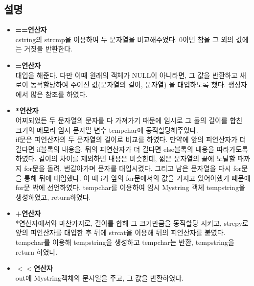 \documentclass[a4paper]{article}
\begin{document}
\subsection{설명}
\begin{itemize}
\item\textbf{==연산자}\\cstring의 strcmp을 이용하여 두 문자열을 비교해주었다. 0이면 참을 그 외의 값에는 거짓을 반환한다.
\item\textbf{=연산자}\\ 대입을 해준다. 다만 이때 원래의 객체가 NULL이 아니라면, 그 값을 반환하고 새로이 동적할당하여 주어진 값(문자열의 길이, 문자열) 을 대입하도록 했다. 생성자에서 많은 참조를 하였다.
\item \textbf{*연산자}\\어찌되었든 두 문자열의 문자를 다 가져가기 때문에 임시로 그 둘의 길이를 합친 크기의 메모리 임시 문자열 변수 tempchar에 동적할당해주었다.\\if문은 피연산자의 두 문자열의 길이로 비교를 하였다. 만약에 앞의 피연산자가 더 길다면 if블록의 내용을, 뒤의 피연산자가 더 길다면 else블록의 내용을 따라가도록 하였다. 길이의 차이를 제외하면 내용은 비슷한데, 짧은 문자열의 끝에 도달할 때까지 for문을 돌려, 번갈아가며 문자를 대입시켰다. 그리고 남은 문자열을 다시 for문을 통해 뒤에 대입했다. 이 때 i가 앞의 for문에서의 값을 가지고 있어야했기 때문에 for문 밖에 선언하였다. tempchar를 이용하여 임시 Mystring 객체 tempstring을 생성하였고, return하였다. 
\item \textbf{+연산자}\\*연산자에서와 마찬가지로, 길이를 합해 그 크기만큼을 동적할당 시키고, strcpy로 앞의 피연산자를 대입한 후 뒤에 strcat을 이용해 뒤의 피연산자를 붙였다. tempchar를 이용해 tempstring을 생성하고 tempchar는 반환, tempstring을 return 하였다.
\item \textbf{$<<$연산자}\\out에 Mystring객체의 문자열을 주고, 그 값을 반환하였다.

\end{itemize}
\end{document}
